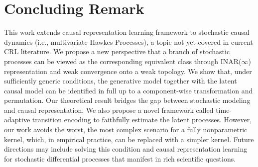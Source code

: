 \documentclass[10pt]{article}
\numberwithin{figure}{section}
\begin{document}
\section{Concluding Remark}

This work extends causal representation learning framework to stochastic causal dynamics (i.e., multivariate Hawkes Processes), a topic not yet covered in current CRL literature. We propose a new perspective that a branch of stochastic processes can be viewed as the corresponding equivalent class through INAR($\infty$) representation and weak convergence onto a weak topology. We show that, under sufficiently generic conditions, the generative model together with the latent causal model can be identified in full up to a component-wise transformation and permutation. Our theoretical result bridges the gap between stochastic modeling and causal representation. We also propose a novel framework called time-adaptive transition encoding to faithfully estimate the latent processes. However, our work avoids the worst, the most complex scenario for a fully nonparametric kernel, which, in empirical practice, can be replaced with a simpler kernel. Future directions may include solving this condition and causal representation learning for stochastic differential processes that manifest in rich scientific questions.





\newpage
\appendix

\theoremstyle{plain}
\newtheorem{atheorem}{Theorem}[section]
\newtheorem{alemma}{Lemma}[section]
\newtheorem{aassumption}{Assumption}[section]
\newtheorem{adefinition}[aassumption]{Definition}
\newtheorem{aremark}[atheorem]{Remark}
\newtheorem{aproposition}{Proposition}[section]
\newtheorem{acorollary}{Corollary}[section]
\newtheorem{aexample}{Example}
\newtheorem{aclaim}{Claim}[section]
\newcommand{\atheoremautorefname}{Theorem}
\newcommand{\alemmaautorefname}{Lemma}
\newcommand{\aassumptionautorefname}{Assumption}
\newcommand{\adefinitionautorefname}{Definition}
\newcommand{\aremarkautorefname}{Remark}
\newcommand{\apropositionautorefname}{Proposition}
\newcommand{\acorollaryautorefname}{Corollary}
\newcommand{\aclaimautorefname}{Claim}
\newcommand{\aexampleautorefname}{Example}
\end{document}
